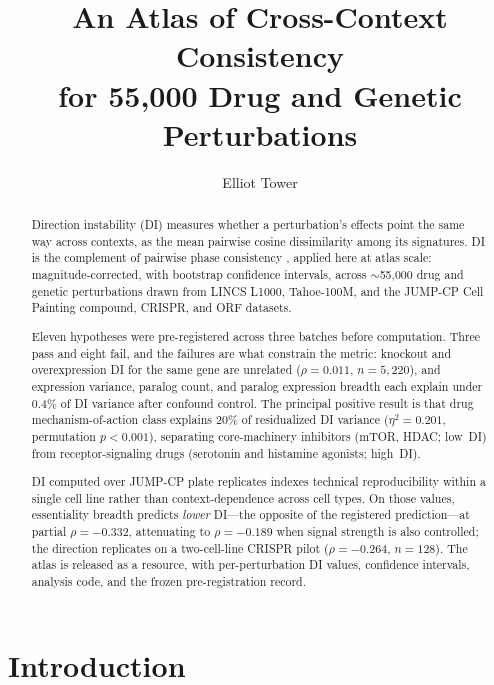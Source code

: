 \documentclass[11pt]{article}
\title{An Atlas of Cross-Context Consistency\\
for 55,000 Drug and Genetic Perturbations}
\author{Elliot Tower}
\affil{Independent researcher \\ \texttt{elliot@elliottower.ai}}
\date{}
\begin{document}
\maketitle

\begin{abstract}
Direction instability (DI) measures whether a perturbation's effects point the
same way across contexts, as the mean pairwise cosine dissimilarity among its
signatures.  DI is the complement of pairwise phase consistency
\citep{vinck2010ppc}, applied here at atlas scale: magnitude-corrected, with
bootstrap confidence intervals, across ${\sim}$55{,}000 drug and genetic
perturbations drawn from LINCS L1000, Tahoe-100M, and the JUMP-CP Cell Painting
compound, CRISPR, and ORF datasets.

Eleven hypotheses were pre-registered across three batches before computation.
Three pass and eight fail, and the failures are what constrain the metric:
knockout and overexpression DI for the same gene are unrelated
($\rho = 0.011$, $n = 5{,}220$), and expression variance, paralog count, and
paralog expression breadth each explain under 0.4\% of DI variance after
confound control.  The principal positive result is that drug
mechanism-of-action class explains 20\% of residualized DI variance
($\eta^2 = 0.201$, permutation $p < 0.001$), separating core-machinery
inhibitors (mTOR, HDAC; low~DI) from receptor-signaling drugs (serotonin and
histamine agonists; high~DI).

DI computed over JUMP-CP plate replicates indexes technical reproducibility
within a single cell line rather than context-dependence across cell types.
On those values, essentiality breadth predicts \emph{lower} DI---the opposite
of the registered prediction---at partial $\rho = -0.332$, attenuating to
$\rho = -0.189$ when signal strength is also controlled; the direction
replicates on a two-cell-line CRISPR pilot ($\rho = -0.264$, $n = 128$).  The
atlas is released as a resource, with per-perturbation DI values, confidence
intervals, analysis code, and the frozen pre-registration record.
\end{abstract}


\section{Introduction}
\end{document}
